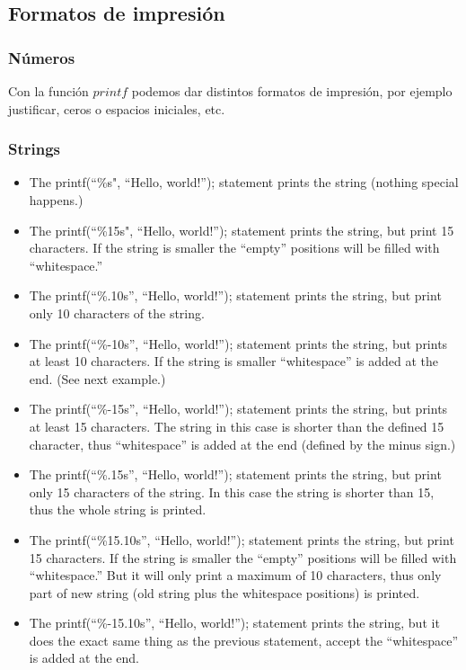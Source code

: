 \documentclass[10pt,letterpaper,twocolumn]{article}
\newcommand{\source}[1]{
	
	\dotfill
}
\begin{document}
	\subsection{Formatos de impresión}
		\subsubsection{Números}
		Con la función $printf$ podemos dar distintos formatos de impresión, por ejemplo justificar, ceros o espacios iniciales, etc.
			\source{./src/printFormat.cpp}
		\subsubsection{Strings}
		\begin{itemize}
			\item The printf(“\%s", “Hello, world!”); statement prints the string (nothing special happens.)
			\item The printf(“\%15s", “Hello, world!”); statement prints the string, but print 15 characters. If the string is smaller the “empty” positions will be filled with “whitespace.”
			\item The printf(“\%.10s”, “Hello, world!”); statement prints the string, but print only 10 characters of the string.
			\item The printf(“\%-10s”, “Hello, world!”); statement prints the string, but prints at least 10 characters. If the string is smaller “whitespace” is added at the end. (See next example.)
			\item The printf(“\%-15s”, “Hello, world!”); statement prints the string, but prints at least 15 characters. The string in this case is shorter than the defined 15 character, thus “whitespace” is added at the end (defined by the minus sign.)
			\item The printf(“\%.15s”, “Hello, world!”); statement prints the string, but print only 15 characters of the string. In this case the string is shorter than 15, thus the whole string is printed.
			\item The printf(“\%15.10s”, “Hello, world!”); statement prints the string, but print 15 characters.
If the string is smaller the “empty” positions will be filled with “whitespace.” But it will only print a maximum of 10 characters, thus only part of new string (old string plus the whitespace positions) is printed.
			\item The printf(“\%-15.10s”, “Hello, world!”); statement prints the string, but it does the exact same thing as the previous statement, accept the “whitespace” is added at the end.
		\end{itemize}
\end{document}
